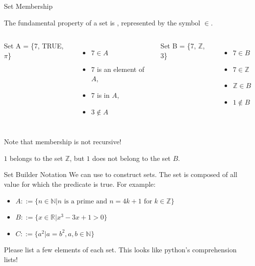 \begin{frame}[t]{Set Membership}

  The fundamental property of a set is , represented by the symbol $\in$.\bigskip

  \begin{columns}
  Set A = \{7, TRUE, $\pi$\}
  \begin{itemize}
  \item $7 \in A$
  \item 7 is an element of $A$,
  \item 7 is in $A$,
  \item $3 \notin A$
  \end{itemize}\bigskip

  Set B = \{7, $\mathbb{Z}$, 3\}
  \begin{itemize}
    \item $7 \in B$
    \item $7 \in \mathbb{Z}$
    \item $\mathbb{Z} \in B$
    \item \alert{$1 \notin B$}
  \end{itemize}
\end{columns}\bigskip

Note that membership is \alert{not} recursive!\bigskip

$1$ belongs to the set $\mathbb{Z}$, but $1$ does not belong to the set $B$.
\end{frame}

\begin{frame}[t]{Set Builder Notation}
  We can use  to construct sets. The set is composed of all value for which the predicate is true. For example:\bigskip 

  \begin{itemize}
  \item $A ::= \{n \in \mathbb{N} | n \text{ is a prime and } n = 4k + 1 \text{ for } k \in \mathbb{Z} \}$
  \item $B ::= \{x \in \mathbb{R} | x^3 - 3x + 1 > 0\}$
  \item $C ::= \{a^2 | a = b^2, a, b \in \mathbb{N}\}$ 
  \end{itemize}\bigskip

  Please list a few elements of each set. This looks like python's comprehension lists!
\end{frame}

